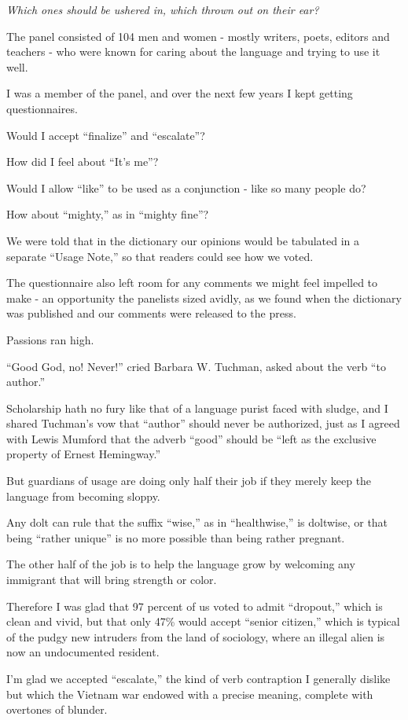 \documentclass{book}
\numberwithin{equation}{section}
\begin{document}
\textit{Which ones should be ushered in, which thrown out on their ear?}

The panel consisted of 104 men and women - mostly writers, poets, editors and teachers - who were known for caring about the language and trying to use it well.

I was a member of the panel, and over the next few years I kept getting questionnaires.

Would I accept ``finalize'' and ``escalate''?

How did I feel about ``It's me''?

Would I allow ``like'' to be used as a conjunction - like so many people do?

How about ``mighty,'' as in ``mighty fine''?

%
We were told that in the dictionary our opinions would be tabulated in a separate ``Usage Note,'' so that readers could see how we voted.

The questionnaire also left room for any comments we might feel impelled to make - an opportunity the panelists sized avidly, as we found when the dictionary was published and our comments were released to the press.

Passions ran high.

``Good God, no! Never!'' cried Barbara W. Tuchman, asked about the verb ``to author.''

Scholarship hath no fury like that of a language purist faced with sludge, and I shared Tuchman's vow that ``author'' should never be authorized, just as I agreed with Lewis Mumford that the adverb ``good'' should be ``left as the exclusive property of Ernest Hemingway.''

%
But guardians of usage are doing only half their job if they merely keep the language from becoming sloppy.

Any dolt can rule that the suffix ``wise,'' as in ``healthwise,'' is doltwise, or that being ``rather unique'' is no more possible than being rather pregnant.

The other half of the job is to help the language grow by welcoming any immigrant that will bring strength or color.

Therefore I was glad that 97 percent of us voted to admit ``dropout,'' which is clean and vivid, but that only 47\% would accept ``senior citizen,'' which is typical of the pudgy new intruders from the land of sociology, where an illegal alien is now an undocumented resident.

I'm glad we accepted ``escalate,'' the kind of verb contraption I generally dislike but which the Vietnam war endowed with a precise meaning, complete with overtones of blunder.
\end{document}
